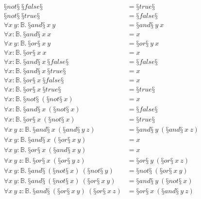 \begin{conjectureset}[H]
\begin{align}
§not§\ §false§ &= §true§ \label{overlapenum:not_false1} \\
§not§\ §true§ &= §false§ \label{overlapenum:not_true1}\\
\forall x\ y : \mathbb{B}.\ §and§\ x\ y &= §and§\ y\ x \label{overlapenum:and_comm1}\\
\forall x : \mathbb{B}.\ §and§\ x\ x &= x \label{overlapenum:and_self1}\\
\forall x\ y : \mathbb{B}.\ §or§\ x\ y &= §or§\ y\ x \label{overlapenum:or_comm1}\\
\forall x : \mathbb{B}.\ §or§\ x\ x &= x \label{overlapenum:or_self1}\\
\forall x : \mathbb{B}.\ §and§\ x\ §false§ &= §false§ \label{overlapenum:and_false1}\\
\forall x : \mathbb{B}.\ §and§\ x\ §true§ &= x \label{overlapenum:and_true1}\\
\forall x : \mathbb{B}.\ §or§\ x\ §false§ &= x \label{overlapenum:or_false1}\\
\forall x : \mathbb{B}.\ §or§\ x\ §true§ &= §true§ \label{overlapenum:or_true1}\\
\forall x : \mathbb{B}.\ §not§\ (§not§\ x) &= x \label{overlapenum:not_not1}\\
\forall x : \mathbb{B}.\ §and§\ x\ (§not§\ x) &= §false§ \label{overlapenum:and_not_self1}\\
\forall x : \mathbb{B}.\ §or§\ x\ (§not§\ x) &= §true§ \label{overlapenum:or_not_self1}\\
\forall x\ y\ z : \mathbb{B}.\ §and§\ x\ (§and§\ y\ z) &= §and§\ y\ (§and§\ x\ z) \label{overlapenum:and_left_comm1}\\
\forall x\ y : \mathbb{B}.\ §and§\ x\ (§or§\ x\ y) &= x \label{overlapenum:false_positive1}\\
\forall x\ y : \mathbb{B}.\ §or§\ x\ (§and§\ x\ y) &= x \label{overlapenum:false_positive2}\\
\forall x\ y\ z : \mathbb{B}.\ §or§\ x\ (§or§\ y\ z) &= §or§\ y\ (§or§\ x\ z) \label{overlapenum:or_left_comm1}\\
\forall x\ y : \mathbb{B}.\ §and§\ (§not§\ x)\ (§not§\ y) &= §not§\ (§or§\ x\ y) \label{overlapenum:not_or1}\\
\forall x\ y : \mathbb{B}.\ §and§\ (§not§\ x)\ (§or§\ x\ y) &= §and§\ y\ (§not§\ x) \label{overlapenum:false_positive3}\\
\forall x\ y\ z : \mathbb{B}.\ §and§\ (§or§\ x\ y)\ (§or§\ x\ z) &= §or§\ x\ (§and§\ y\ z) \label{overlapenum:or_and_distrib_left1}\\

\end{align}
\end{conjectureset}
